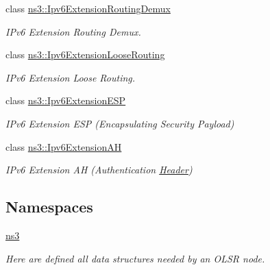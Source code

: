 \begin{DoxyCompactItemize}
class \hyperlink{classns3_1_1Ipv6ExtensionRoutingDemux}{ns3\+::\+Ipv6\+Extension\+Routing\+Demux}
\begin{DoxyCompactList}\small\item\em I\+Pv6 Extension Routing Demux. \end{DoxyCompactList}\item 
class \hyperlink{classns3_1_1Ipv6ExtensionLooseRouting}{ns3\+::\+Ipv6\+Extension\+Loose\+Routing}
\begin{DoxyCompactList}\small\item\em I\+Pv6 Extension Loose Routing. \end{DoxyCompactList}\item 
class \hyperlink{classns3_1_1Ipv6ExtensionESP}{ns3\+::\+Ipv6\+Extension\+E\+SP}
\begin{DoxyCompactList}\small\item\em I\+Pv6 Extension E\+SP (Encapsulating Security Payload) \end{DoxyCompactList}\item 
class \hyperlink{classns3_1_1Ipv6ExtensionAH}{ns3\+::\+Ipv6\+Extension\+AH}
\begin{DoxyCompactList}\small\item\em I\+Pv6 Extension AH (Authentication \hyperlink{classns3_1_1Header}{Header}) \end{DoxyCompactList}\end{DoxyCompactItemize}
\subsection*{Namespaces}
\begin{DoxyCompactItemize}
\item 
 \hyperlink{namespacens3}{ns3}
\begin{DoxyCompactList}\small\item\em Here are defined all data structures needed by an O\+L\+SR node. \end{DoxyCompactList}\end{DoxyCompactItemize}
